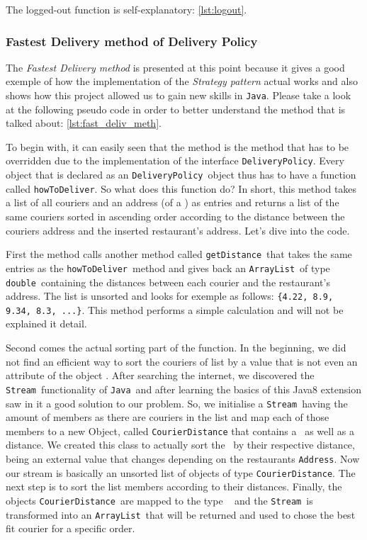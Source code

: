 The logged-out function is self-explanatory: \ref{lst:logout}.


\subsubsection{Fastest Delivery method of Delivery Policy} %
\label{ssub:fastest_delivery_method_of_delivery_policy}

The \emph{Fastest Delivery method} is presented at this point because it gives a good exemple of how the implementation of the \emph{Strategy pattern} actual works and also shows how this project allowed us to gain new skills in \lstinline|Java|. Please take a look at the following pseudo code in order to better understand the method that is talked about: 
\ref{lst:fast_deliv_meth}. 

To begin with, it can easily seen that the method is the method that has to be overridden due to the implementation of the interface \lstinline|DeliveryPolicy|. Every object that is declared as an \lstinline|DeliveryPolicy|~object thus has to have a function called \lstinline|howToDeliver|. So what does this function do? In short, this method takes a list of all couriers and an address (of a \Restaurant) as entries and returns a list of the same couriers sorted in ascending order according to the distance between the couriers address and the inserted restaurant's address. Let's dive into the code.

First the method calls another method called \lstinline|getDistance|~that takes the same entries as the \lstinline|howToDeliver|~method and gives back an \lstinline|ArrayList|~of type \lstinline|double|~containing the distances between each courier and the restaurant's address. The list is unsorted and looks for exemple as follows: \lstinline|{4.22, 8.9, 9.34, 8.3, ...}|. This method performs a simple calculation and will not be explained it detail.

Second comes the actual sorting part of the function. In the beginning, we did not find an efficient way to sort the couriers of list by a value that is not even an attribute of the object \Courier. After searching the internet, we discovered the \lstinline|Stream|~functionality of \lstinline|Java|~and after learning the basics of this Java8 extension saw in it a good solution to our problem. So, we initialise a \lstinline|Stream|~having the amount of members as there are couriers in the list and map each of those members to a new Object, called 
\lstinline|CourierDistance| that contains a \Courier~as well as a distance. We created this class to actually sort the \Courier~by their respective distance, being an external value that changes depending on the restaurants \lstinline|Address|. Now our stream is basically an unsorted list of objects of type \lstinline|CourierDistance|. The next step is to sort the list members according to their distances. Finally, the objects \lstinline|CourierDistance|~are mapped to the type \Courier~ and the \lstinline|Stream|~is transformed into an \lstinline|ArrayList|~that will be returned and used to chose the best fit courier for a specific order. 

